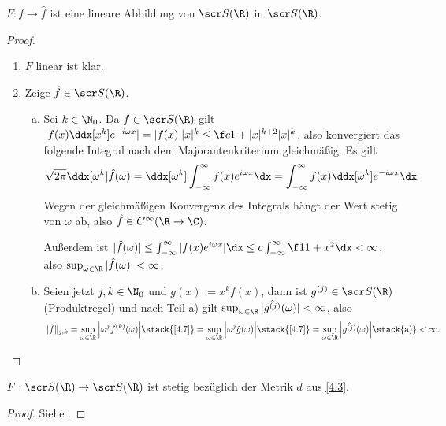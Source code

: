 \begin{st} \label{4.8}
	$F : f \to \hat f$ ist eine lineare Abbildung von $\scr S(\R)$ in $\scr S(\R)$.

	\begin{proof}
		\begin{enumerate}[1)]
			\item
				$F$ linear ist klar.
			\item
				Zeige $\hat f \in \scr S(\R)$.
				\begin{enumerate}[a)]
					\item
						Sei $k \in \N_0$.
						Da $f \in \scr S(\R)$ gilt $|f(x) \ddx[x^k] e^{-i\omega x}| = |f(x)||x|^k \le \f c{1+|x|^{k+2}} |x|^k$, also konvergiert das folgende Integral nach dem Majorantenkriterium gleichmäßig.
						Es gilt
						\begin{align*}
							\sqrt{2\pi} \ddx[\omega^k] \hat f(\omega)
							= \ddx[\omega^k] \int_{-\infty}^\infty f(x) e^{i \omega x} \dx
							= \int_{-\infty}^\infty f(x) \ddx[\omega^k] e^{- i \omega x} \dx
						\end{align*}
						Wegen der gleichmäßigen Konvergenz des Integrals hängt der Wert stetig von $\omega$ ab, also $\hat f \in C^\infty(\R \to \C)$.

						Außerdem ist $|\hat f(\omega)| \le \int_{-\infty}^\infty |f(x) e^{i\omega x}| \dx \le c \int_{-\infty}^\infty \f 1{1+x^2} \dx < \infty$, also $\sup_{\omega\in\R} |\hat f(\omega)| < \infty$.
					\item
						Seien jetzt $j,k \in \N_0$ und $g(x) := x^k f(x)$, dann ist $g^{(j)} \in \scr S(\R)$ (Produktregel) und nach Teil a) gilt $\sup_{\omega \in \R}|\hat {g^{(j)}}(\omega)| < \infty$, also
						\[
							\|\hat f\|_{j,k}
							= \sup_{\omega\in\R} \Big| \omega^j {\hat f}^{(k)}(\omega) \Big|
							\stack{\ref{4.7}}= \sup_{\omega\in\R} \Big| \omega^j \hat g(\omega) \Big|
							\stack{\ref{4.7}}= \sup_{\omega\in\R} \Big| \hat {g^{(j)}}(\omega) \Big|
							\stack{\text{a)}}< \infty.
						\]
				\end{enumerate}
		\end{enumerate}
	\end{proof}
\end{st}

\begin{nt} \label{4.9}
	$F : \scr S(\R) \to \scr S(\R)$ ist stetig bezüglich der Metrik $d$ aus \ref{4.3}.
	\begin{proof}
		Siehe .
	\end{proof}
\end{nt}

